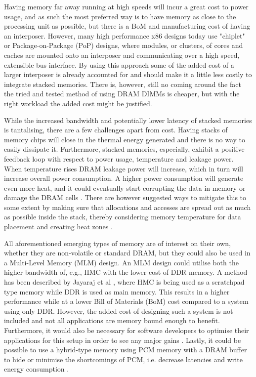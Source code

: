 Having memory far away running at high speeds will incur a great cost to power usage, and as such the most preferred way is to have memory as close to the processing unit as possible, but there is a BoM and manufacturing cost of having an interposer. However, many high performance x86 designs today use "chiplet" or Package-on-Package (PoP) designs, where modules, or clusters, of cores and caches are mounted onto an interposer and communicating over a high speed, extensible bus interface. By using this approach some of the added cost of a larger interposer is already accounted for and should make it a little less costly to integrate stacked memories. There is, however, still no coming around the fact the tried and tested method of using DRAM DIMMs is cheaper, but with the right workload the added cost might be justified.
\bigskip

While the increased bandwidth and potentially lower latency of stacked memories is tantalising, there are a few challenges apart from cost. Having stacks of memory chips will close in the thermal energy generated and there is no way to easily dissipate it. Furthermore, stacked memories, especially, exhibit a positive feedback loop with respect to power usage, temperature and leakage power. When temperature rises DRAM leakage power will increase, which in turn will increase overall power consumption. A higher power consumption will generate even more heat, and it could eventually start corrupting the data in memory or damage the DRAM cells \cite{4212027}. There are however suggested ways to mitigate this to some extent by making sure that allocations and accesses are spread out as much as possible inside the stack, thereby considering memory temperature for data placement and creating heat zones \cite{7252085}.
\bigskip

All aforementioned emerging types of memory are of interest on their own, whether they are non-volatile or standard DRAM, but they could also be used in a Multi-Level Memory (MLM) design. An MLM design could utilise both the higher bandwidth of, e.g., HMC with the lower cost of DDR memory. A method has been described by Jayaraj et al \cite{Jayaraj:2015:PPM:2818950.2818976}, where HMC is being used as a scratchpad type memory while DDR is used as main memory. This results in a higher performance while at a lower Bill of Materials (BoM) cost compared to a system using only DDR. However, the added cost of designing such a system is not included and not all applications are memory bound enough to benefit. Furthermore, it would also be necessary for software developers to optimise their applications for this setup in order to see any major gains \cite{Bender:2015:KCT:2818950.2818977, BENDER2017213}. Lastly, it could be possible to use a hybrid-type memory using PCM memory with a DRAM buffer to hide or minimise the shortcomings of PCM, i.e. decrease latencies and write energy consumption \cite{Lee:2009:APC:1555815.1555758}.
\bigskip


